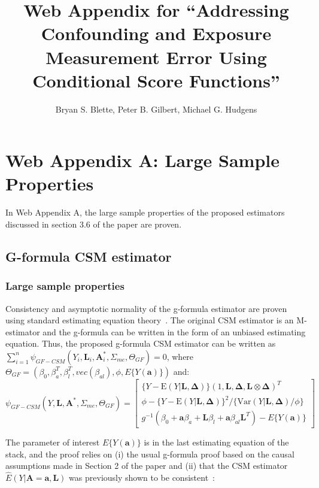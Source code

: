 \documentclass[12pt]{article}
\title{Web Appendix for ``Addressing Confounding and Exposure Measurement Error Using Conditional Score Functions''}
\author{Bryan S. Blette, Peter B. Gilbert, Michael G. Hudgens}
\date{}
\begin{document}


\maketitle

\section{Web Appendix A: Large Sample Properties}

In Web Appendix A, the large sample properties of the proposed estimators discussed in section 3.6 of the paper are proven.

\subsection{G-formula CSM estimator}

\subsubsection{Large sample properties}

Consistency and asymptotic normality of the g-formula estimator are proven using standard estimating equation theory~\citep{stefanski2002}. The original CSM estimator is an M-estimator and the g-formula can be written in the form of an unbiased estimating equation. Thus, the proposed g-formula CSM estimator can be written as $\sum_{i=1}^{n} \psi_{GF-CSM}(Y_{i}, \bm{L}_{i}, \bm{A}^{*}_{i}, \Sigma_{me}, \Theta_{GF}) = 0$, where $\Theta_{GF} = (\beta_{0}, \beta^{T}_{a}, \beta^{T}_{l}, vec(\beta_{al}), \phi, E \{ Y(\bm{a}) \})$ and:
\begin{equation*}
    \psi_{GF-CSM}(Y, \bm{L}, \bm{A}^{*}, \Sigma_{me}, \Theta_{GF}) =
    \begin{bmatrix}
       \{ Y - \text{E}(Y | \bm{L}, \bm{\Delta}) \} (1, \bm{L}, \bm{\Delta}, \bm{L} \otimes \bm{\Delta})^{T} \\
        \phi - \{ Y - \text{E}(Y | \bm{L}, \bm{\Delta}) \}^{2} / \{ \text{Var}(Y | \bm{L}, \bm{\Delta}) / \phi \} \\
        g^{-1}(\beta_{0} + \bm{a}\beta_{a} + \bm{L}\beta_{l} +
        \bm{a}\beta_{al}\bm{L}^{T}) - E \{ Y(\bm{a}) \}
    \end{bmatrix}
\end{equation*}

The parameter of interest $E \{ Y(\bm{a}) \}$ is in the last estimating equation of the stack, and the proof relies on (i) the usual g-formula proof based on the causal assumptions made in Section 2 of the paper and (ii) that the CSM estimator $\hat{E}(Y | \bm{A} = \bm{a}, \bm{L})$ was previously shown to be consistent~\citep{carroll2006}:
\end{document}
